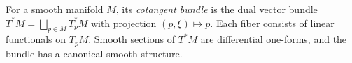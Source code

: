 
For a smooth manifold $M$, its \emph{cotangent bundle} is the dual vector bundle $T^*M=\bigsqcup_{p\in M}T_p^*M$ with projection $(p,\xi)\mapsto p$. Each fiber consists of linear functionals on $T_pM$. Smooth sections of $T^*M$ are differential one-forms, and the bundle has a canonical smooth structure.
